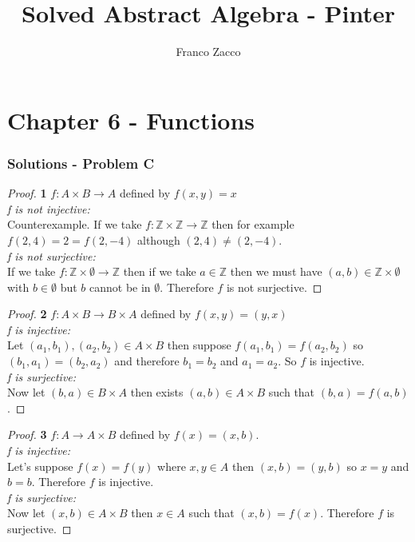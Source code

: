 \documentclass[11pt]{article}
\title{\textbf{Solved Abstract Algebra - Pinter}}
\author{Franco Zacco}
\date{}
\begin{document}
\maketitle
\thispagestyle{empty}

\section*{Chapter 6 - Functions}

	\subsubsection*{Solutions - Problem C}
		\begin{proof}{\textbf{1}} $f: A \times B \rightarrow A$ defined by $f(x,y)=x$\\
			\textit{f is not injective:}\\
				Counterexample. If we take $f:\mathbb{Z} \times \mathbb{Z} \rightarrow \mathbb{Z}$ then for example $f(2,4)=2=f(2,-4)$ although $(2,4) \neq (2,-4)$.\\
			\textit{f is not surjective:}\\
				If we take $f:\mathbb{Z} \times \emptyset \rightarrow \mathbb{Z}$ then if we take $a \in \mathbb{Z}$ then we must have $(a,b) \in \mathbb{Z} \times \emptyset$  with $b \in \emptyset$ but $b$ cannot be in $\emptyset$. Therefore $f$ is not surjective.
		\end{proof}
		\begin{proof}{\textbf{2}} $f: A \times B \rightarrow B \times A$ defined by $f(x,y)=(y,x)$\\
			\textit{f is injective:}\\
				Let $(a_1,b_1),(a_2,b_2) \in A \times B$ then suppose $f(a_1,b_1)=f(a_2,b_2)$ so $(b_1,a_1) = (b_2,a_2)$ and therefore $b_1=b_2$ and $a_1=a_2$. So $f$ is injective.
			\\\textit{f is surjective:}\\
				Now let $(b,a) \in B \times A$ then exists $(a,b) \in A \times B$ such that $(b,a)=f(a,b)$.
		\end{proof}
		\begin{proof}{\textbf{3}} $f: A \rightarrow A \times B$ defined by $f(x)=(x,b)$.\\
			\textit{f is injective:}\\
				Let's suppose $f(x)=f(y)$ where $x,y \in A$ then $(x,b)=(y,b)$ so $x=y$ and $b=b$. Therefore $f$ is injective.
			\\\textit{f is surjective:}\\
				Now let $(x,b) \in A \times B$ then $x \in A$ such that $(x,b)=f(x)$. Therefore $f$ is surjective.				
		\end{proof}
\end{document}
